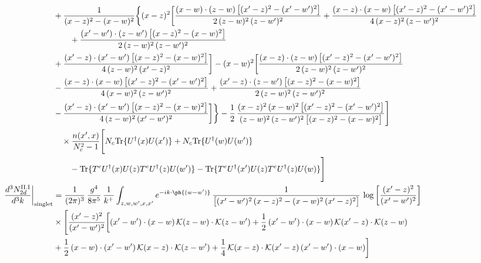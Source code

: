 \begin{align}
&+\frac{1}{(x-z)^{2}-(x-w)^{2}}\bigg\{(x-z)^{2}\bigg[\frac{(x-w)\cdot(z-w)\,\big[(x^{\prime}-z)^{2}-(x^{\prime}-w^{\prime})^{2}\big]}{2\,(z-w)^{2}\,(z-w^{\prime})^{2}}+\frac{(x-z)\cdot(x-w)\,\big[(x^{\prime}-z)^{2}-(x^{\prime}-w^{\prime})^{2}\big]}{4\,(x-z)^{2}\,(z-w^{\prime})^{2}}\notag\\ &\qquad+\frac{(x^{\prime}-w^{\prime})\cdot(z-w^{\prime})\,\big[(x-z)^{2}-(x-w)^{2}\big]}{2\,(z-w)^{2}\,(z-w^{\prime})^{2}}\notag \\ & +\frac{(x^{\prime}-z)\cdot(x^{\prime}-w^{\prime})\,\big[(x-z)^{2}-(x-w)^{2}\big]}{4\,(z-w)^{2}\,(x^{\prime}-z)^{2}}\bigg]-(x-w)^{2}\bigg[\frac{(x-z)\cdot(z-w)\,\big[(x^{\prime}-z)^{2}-(x^{\prime}-w^{\prime})^{2}\big]}{2\,(z-w)^{2}\,(z-w^{\prime})^{2}}\notag \\ & -\frac{(x-z)\cdot(x-w)\,\big[(x^{\prime}-z)^{2}-(x^{\prime}-w^{\prime})^{2}\big]}{4\,(x-w)^{2}\,(z-w^{\prime})^{2}}+\frac{(x^{\prime}-z)\cdot(z-w^{\prime})\,\big[(x-z)^{2}-(x-w)^{2}\big]}{2\,(z-w)^{2}\,(z-w^{\prime})^{2}}\notag \\ & -\frac{(x^{\prime}-z)\cdot(x^{\prime}-w^{\prime})\,\big[(x-z)^{2}-(x-w)^{2}\big]}{4\,(z-w)^{2}\,(x^{\prime}-w^{\prime})^{2}}\bigg]\bigg\}-\frac{1}{2}\,\frac{(x-z)^{2}\,(x-w)^{2}\,\big[(x^{\prime}-z)^{2}-(x^{\prime}-w^{\prime})^{2}\big]}{(z-w)^{2}\,(z-w^{\prime})^{2}\,\big[(x-z)^{2}-(x-w)^{2}\big]}\Bigg]\notag\\ &\quad\times\frac{n(x',x)}{N_{c}^{2}-1}\Bigg[N_{c}{\rm Tr}\{U^{\dagger}(x)U(x')\}+N_{c}{\rm Tr}\{U^{\dagger}(w)U(w')\}\notag\\ &\qquad-{\rm Tr}\{T^{e}U^{\dagger}(x)U(z)T^{e}U^{\dagger}(z)U(w')\}-{\rm Tr}\{T^{e}U^{\dagger}(x')U(z)T^{e}U^{\dagger}(z)U(w)\}\Bigg]\\
\frac{d^{3}N^{\rm II.I}_{2d}}{d^{3}k}\bigg|_{\rm singlet}&= \frac{1}{(2\pi)^{3}}\,\frac{g^{4}}{8\pi^{5}}\,\frac{1}{k^{+}}\int_{z,w,w^{\prime},x,x^{\prime}}e^{-ik\cdot\ph{(w-w^{\prime})}}\,\frac{1}{\big[(x^{\prime}-w^{\prime})^{2}\,(x-z)^{2}-(x-w)^{2}\,(x^{\prime}-z)^{2}\big]}\,\log\left[\frac{(x^{\prime}-z)^{2}}{(x^{\prime}-w^{\prime})^{2}}\right]\notag\\
&\times\Bigg[\frac{(x^{\prime}-z)^{2}}{(x^{\prime}-w^{\prime})^{2}}\bigg[(x^{\prime}-w^{\prime})\cdot(x-w)\,\mathcal{K}(z-w)\cdot\mathcal{K}(z-w^{\prime})+\frac{1}{2}\,(x^{\prime}-w^{\prime})\cdot(x-w)\,\mathcal{K}(x^{\prime}-z)\cdot\mathcal{K}(z-w)\notag \\ & +\frac{1}{2}\,(x-w)\cdot(x^{\prime}-w^{\prime})\,\mathcal{K}(x-z)\cdot\mathcal{K}(z-w^{\prime})+\frac{1}{4}\,\mathcal{K}(x-z)\cdot\mathcal{K}(x^{\prime}-z)\,(x^{\prime}-w^{\prime})\cdot(x-w)\bigg]\notag\\

\end{align}
